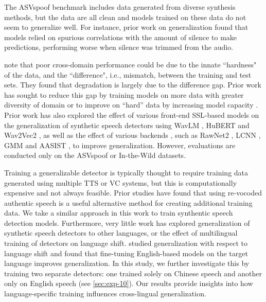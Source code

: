 The ASVspoof benchmark \cite{wu15e_interspeech} includes data generated from diverse synthesis methods, but the data are all clean and models trained on these data do not seem to generalize well. For instance, prior work on generalization \cite{müller2021speechsilversilencegolden} found that models relied on spurious correlations with the amount of silence to make predictions, performing worse when silence was trimmed from the audio.

\cite{müller2024harderdifferentunderstandinggeneralization} note that poor cross-domain performance could be due to the innate ``hardness" of the data, and the ``difference", i.e., mismatch, between the training and test sets. They found that degradation is largely due to the difference gap. Prior work has sought to reduce this gap by training models on more data with greater diversity of domain \cite{shim2023multidatasetcotrainingsharpnessawareoptimization} or to improve on ``hard'' data by increasing model capacity \cite{7993036,8398462,8812621,chen17_interspeech}.
Prior work \cite{wang2022investigatingselfsupervisedendsspeech,kulkarni24_asvspoof} has also explored the effect of various front-end SSL-based models on the generalization of synthetic speech detectors using WavLM \cite{Chen_2022}, HuBERT \cite{hsu2021hubert} and Wav2Vec2 \cite{baevski2020wav2vec20frameworkselfsupervised}, as well as the effect of various backends \citet{kang2024experimentalstudyenhancingvoice}, such as RawNet2 \cite{jung2020improvedrawnetfeaturemap}, LCNN \cite{wu2018lightcnndeepface}, GMM and AASIST \cite{jung2021aasistaudioantispoofingusing}, to improve generalization. However, evaluations are conducted only on the ASVspoof or In-the-Wild datasets.

Training a generalizable detector is typically thought to require training data generated using multiple TTS or VC systems, but this is computationally expensive and not always feasible. Prior studies \cite{wang2023largescalevocodedspoofeddata, wang2023spoofedtrainingdataspeech, sanchez14b_interspeech} have found that using re-vocoded authentic speech is a useful alternative method for creating additional training data. We take a similar approach in this work to train synthentic speech detection models. Furthermore, very little work has explored generalization of synthetic speech detectors to other languages, or the effect of multilingual training of detectors on language shift. \citet{marek2024audiodeepfakedetectionmodels} studied generalization with respect to language shift and found that fine-tuning English-based models on the target language improves generalization. 
In this study, we further investigate this by training two separate detectors: one trained solely on Chinese speech and another only on English speech (see \autoref{sec:exp-10}). Our results provide insights into how language-specific training influences cross-lingual generalization.
